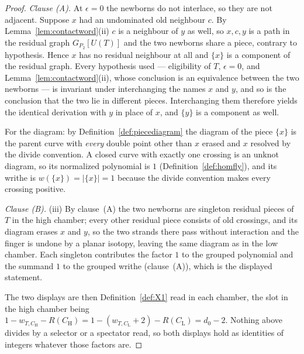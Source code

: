 \begin{proof}
\emph{Clause (A).} At $\epsilon=0$ the newborns do not interlace, so they are not adjacent. Suppose
$x$ had an undominated old neighbour $c$. By Lemma~\ref{lem:contactword}(ii) $c$ is a
neighbour of $y$ as well, so $x,c,y$ is a path in the residual graph
$G_{P_2}[U(T)]$ and the two newborns share a piece, contrary to hypothesis.
Hence $x$ has no residual neighbour at all and $\{x\}$ is a component of the
residual graph. Every hypothesis used --- eligibility of $T$, $\epsilon=0$, and
Lemma~\ref{lem:contactword}(ii), whose conclusion is an equivalence between the two
newborns --- is invariant under interchanging the names $x$ and $y$, and so is
the conclusion that the two lie in different pieces. Interchanging them
therefore yields the identical derivation with $y$ in place of $x$, and
$\{y\}$ is a component as well.

For the diagram: by Definition~\ref{def:piecediagram} the diagram of the piece
$\{x\}$ is the parent curve with \emph{every} double point other than $x$
erased and $x$ resolved by the divide convention. A closed curve with exactly
one crossing is an unknot diagram, so its normalized polynomial is $1$
(Definition~\ref{def:homfly}), and its writhe is $w(\{x\})=|\{x\}|=1$ because
the divide convention makes every crossing positive.

\emph{Clause (B).} (iii) By clause~(A) the two newborns are singleton
residual pieces of $T$ in the high chamber; every other residual piece consists
of old crossings, and its diagram erases $x$ and $y$, so the two strands there
pass without interaction and the finger is undone by a planar isotopy, leaving
the same diagram as in the low chamber. Each singleton contributes the factor
$1$ to the grouped polynomial and the summand $1$ to the grouped writhe
(clause~(A)), which is the displayed statement.

The two displays are then Definition~\ref{def:X1} read in each chamber, the
slot in the high chamber being
$1-w_{T,C_{\mathrm H}}-R(C_{\mathrm H})=1-(w_{T,C_{\mathrm L}}+2)-R(C_{\mathrm L})=d_0-2$. Nothing above divides by a
selector or a spectator read, so both displays hold as identities of integers
whatever those factors are.
\end{proof}

